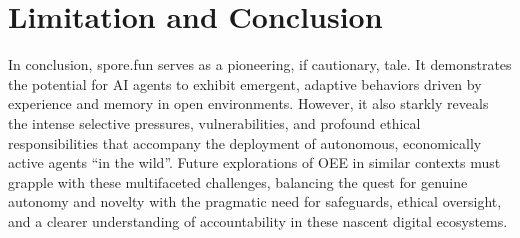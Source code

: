 




\section{Limitation and Conclusion}

In conclusion, spore.fun serves as a pioneering, if cautionary, tale. It demonstrates the potential for AI agents to exhibit emergent, adaptive behaviors driven by experience and memory in open environments. However, it also starkly reveals the intense selective pressures, vulnerabilities, and profound ethical responsibilities that accompany the deployment of autonomous, economically active agents ``in the wild''. Future explorations of OEE in similar contexts must grapple with these multifaceted challenges, balancing the quest for genuine autonomy and novelty with the pragmatic need for safeguards, ethical oversight, and a clearer understanding of accountability in these nascent digital ecosystems.
